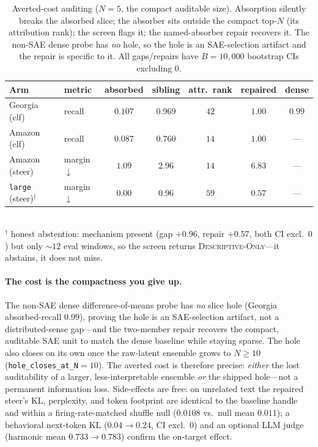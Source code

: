 \documentclass[11pt,letterpaper]{article}
\begin{document}
\begin{table}[t]
\centering\small
\caption{Averted-cost auditing ($N{=}5$, the compact auditable size). Absorption silently breaks the absorbed slice; the absorber sits outside the compact top-$N$ (its attribution rank); the screen flags it; the named-absorber repair recovers it. The non-SAE dense probe has \emph{no} hole, so the hole is an SAE-selection artifact and the repair is specific to it. All gaps/repairs have $B{=}10{,}000$ bootstrap CIs excluding $0$.}
\label{tab:averted}
\begin{tabular}{llccccc}
\toprule
Arm & metric & absorbed & sibling & attr.\ rank & repaired & dense \\
\midrule
Georgia (clf) & recall & $0.107$ & $0.969$ & $42$ & $1.00$ & $0.99$ \\
Amazon (clf) & recall & $0.087$ & $0.760$ & $14$ & $1.00$ & --- \\
Amazon (steer) & margin$\downarrow$ & $1.09$ & $2.96$ & $14$ & $6.83$ & --- \\
\texttt{large} (steer)$^\dagger$ & margin$\downarrow$ & $0.00$ & $0.96$ & $59$ & $0.57$ & --- \\
\bottomrule
\end{tabular}
\\[2pt]
{\footnotesize $^\dagger$ honest abstention: mechanism present (gap $+0.96$, repair $+0.57$, both CI excl.\ $0$) but only $\sim12$ eval windows, so the screen returns \textsc{Descriptive-Only}---it abstains, it does not miss.}
\end{table}

\paragraph{The cost is the compactness you give up.} The non-SAE dense difference-of-means probe has \emph{no} slice hole (Georgia absorbed-recall $0.99$), proving the hole is an SAE-selection artifact, not a distributed-sense gap---and the two-member repair recovers the compact, auditable SAE unit to match the dense baseline while staying sparse. The hole also closes on its own once the raw-latent ensemble grows to $N\ge10$ (\texttt{hole\_closes\_at\_N}$=10$). The averted cost is therefore precise: \emph{either} the lost auditability of a larger, less-interpretable ensemble \emph{or} the shipped hole---not a permanent information loss. Side-effects are free: on unrelated text the repaired steer's KL, perplexity, and token footprint are identical to the baseline handle and within a firing-rate-matched shuffle null ($0.0108$ vs.\ null mean $0.011$); a behavioral next-token KL ($0.04\to0.24$, CI excl.\ $0$) and an optional LLM judge (harmonic mean $0.733\to0.783$) confirm the on-target effect.
\end{document}
